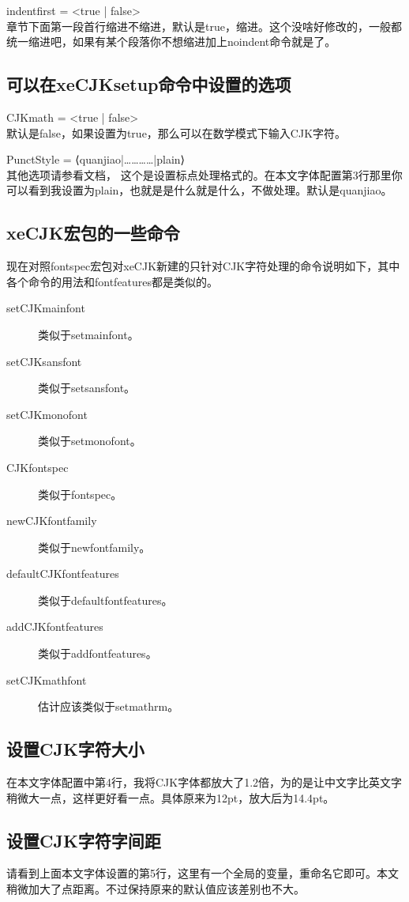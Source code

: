 indentfirst = <true | false>\\
章节下面第一段首行缩进不缩进，默认是true，缩进。这个没啥好修改的，一般都统一缩进吧，如果有某个段落你不想缩进加上noindent命令就是了。

\subsection{可以在xeCJKsetup命令中设置的选项}
CJKmath = <true | false>\\
默认是false，如果设置为true，那么可以在数学模式下输入CJK字符。

PunctStyle = {⟨quanjiao|…………|plain⟩}\\
其他选项请参看文档， 这个是设置标点处理格式的。在本文字体配置第3行那里你可以看到我设置为plain，也就是是什么就是什么，不做处理。默认是quanjiao。

\subsection{xeCJK宏包的一些命令}
现在对照fontspec宏包对xeCJK新建的只针对CJK字符处理的命令说明如下，其中各个命令的用法和fontfeatures都是类似的。
\begin{description}
\item[setCJKmainfont] 类似于setmainfont。
\item[setCJKsansfont] 类似于setsansfont。
\item[setCJKmonofont] 类似于setmonofont。
\item[CJKfontspec] 类似于fontspec。
\item[newCJKfontfamily] 类似于newfontfamily。
\item[defaultCJKfontfeatures] 类似于defaultfontfeatures。
\item[addCJKfontfeatures] 类似于addfontfeatures。
\item[setCJKmathfont] 估计应该类似于setmathrm。
\end{description}

\subsection{设置CJK字符大小}
在本文字体配置中第4行，我将CJK字体都放大了1.2倍，为的是让中文字比英文字稍微大一点，这样更好看一点。具体原来为12pt，放大后为14.4pt。

\subsection{设置CJK字符字间距}
请看到上面本文字体设置的第5行，这里有一个全局的变量，重命名它即可。本文稍微加大了点距离。不过保持原来的默认值应该差别也不大。


